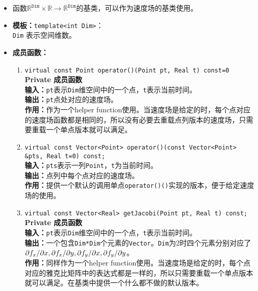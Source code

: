 \documentclass[a4paper,twoside]{ctexart}
\begin{document}
\begin{itemize}
    \item 函数$\mathbb{R}^{\texttt{Dim}}\times\mathbb{R}\rightarrow\mathbb{R}^{\texttt{Dim}}$的基类，可以作为速度场的基类使用。
    \item \textbf{模板：}\texttt{template<int Dim>}：\\\texttt{Dim} 表示空间维数。
    \item \textbf{成员函数：}
            \begin{enumerate}[(1)]
                \item \texttt{virtual const Point operator()(Point pt, Real t) const=0}\\
                \textbf{Private 成员函数}\\
                \textbf{输入：}\texttt{pt}表示\texttt{Dim}维空间中的一个点，\texttt{t}表示当前时间。\\
                \textbf{输出：}\texttt{pt}点处对应的速度场。\\
                \textbf{作用：}作为一个helper function使用。当速度场是给定的时，每个点对应的速度场函数都是相同的，所以没有必要去重载点列版本的速度场，只需要重载一个单点版本就可以满足。
                \item \texttt{virtual const Vector<Point> operator()(const Vector<Point> \&pts, Real t=0) const;}\\
                \textbf{输入：}\texttt{pts}表示一列\texttt{Point}，\texttt{t}为当前时间。\\
                \textbf{输出：}点列中每个点对应的速度场。\\
                \textbf{作用：}提供一个默认的调用单点\texttt{operator()()}实现的版本，便于给定速度场的使用。
                \item \texttt{virtual const Vector<Real> getJacobi(Point pt, Real t) const;}\\
                \textbf{Private 成员函数}\\
                \textbf{输入：}\texttt{pt}表示\texttt{Dim}维空间中的一个点，\texttt{t}表示当前时间。\\
                \textbf{输出：}一个包含\texttt{Dim*Dim}个元素的\texttt{Vector}。\texttt{Dim}为$2$时四个元素分别对应了$\partial f_x/\partial x, \\\partial f_x/\partial y, \partial f_y/\partial x, \partial f_y/\partial y$。\\
                \textbf{作用：}同样作为一个helper function使用。当速度场是给定的时，每个点对应的雅克比矩阵中的表达式都是一样的，所以只需要重载一个单点版本就可以满足。在基类中提供一个什么都不做的默认版本。

\end{enumerate}
\end{itemize}
\end{document}
